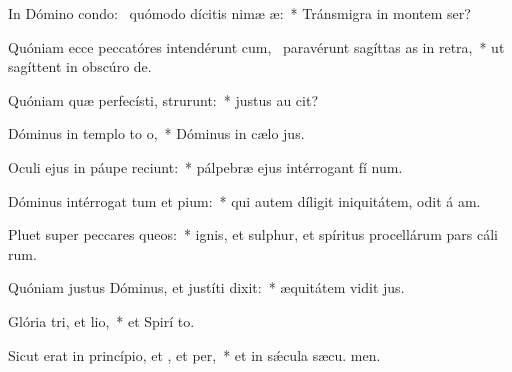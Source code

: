 \item In Dómino condo:~\pscross{} quómodo dícitis nimæ æ:~* Tránsmigra in montem  ser?
\item Quóniam ecce peccatóres intendérunt cum,~\pscross{} paravérunt sagíttas as in retra,~* ut sagíttent in obscúro  de.
\item Quóniam quæ perfecísti, strurunt:~* justus au  cit?
\item Dóminus in templo to o,~* Dóminus in cælo  jus.
\item Oculi ejus in páupe reciunt:~* pálpebræ ejus intérrogant fí num.
\item Dóminus intérrogat tum et pium:~* qui autem díligit iniquitátem, odit á am.
\item Pluet super peccares queos:~* ignis, et sulphur, et spíritus procellárum pars cáli rum.
\item Quóniam justus Dóminus, et justíti dixit:~* æquitátem vidit  jus.
\item Glória tri, et lio,~* et Spirí to.
\item Sicut erat in princípio, et , et per,~* et in sǽcula sæcu. men.
